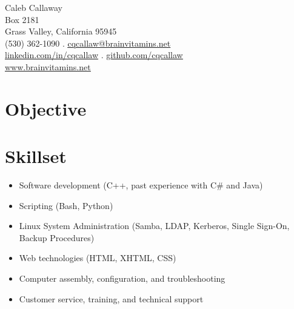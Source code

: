 \documentclass{article}
\begin{document}
	\begin{center}
		{\Large Caleb Callaway}\\
		Box 2181\\
		Grass Valley, California 95945\\
		(530) 362-1090 . \href{mailto:cqcallaw@brainvitamins.net}{\ul{cqcallaw@brainvitamins.net}}\\
		\href{http://linkedin.com/in/cqcallaw/}{\ul{linkedin.com/in/cqcallaw}} . \href{https://github.com/cqcallaw/}{\ul{github.com/cqcallaw}}\\
		\href{https://www.brainvitamins.net/}{\ul{www.brainvitamins.net}}
	\end{center}

	\section*{Objective}

	\section*{Skillset}
	\begin{itemize}[label={}]
		\item Software development (C++, past experience with C\# and Java)
		\item Scripting (Bash, Python)
		\item Linux System Administration (Samba, LDAP, Kerberos, Single Sign-On, Backup Procedures)
		\item Web technologies (HTML, XHTML, CSS)
		\item Computer assembly, configuration, and troubleshooting
		\item Customer service, training, and technical support
	\end{itemize}
\end{document}
